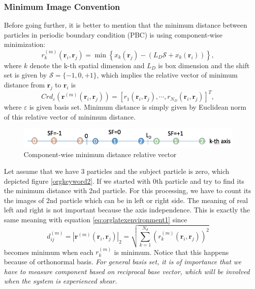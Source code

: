 \documentclass[11pt]{article}
\begin{document}
\subsubsection{Minimum Image Convention}
\label{sec:orgheadline4}
Before going further, it is better to mention that the minimum distance between particles in periodic boundary condition (PBC) is using component-wise minimization:
\begin{equation}
\label{eq:orglatexenvironment1}
r^{(m)}_k(\mathbf{r}_i, \mathbf{r}_j) = \min\left\{x_k(\mathbf{r}_j) - \left(L_D\mathscr{S} + x_k(\mathbf{r}_i)\right)\right\},
\end{equation}
where \(k\) denote the k-th spatial dimension and \(L_D\) is box dimension and the shift set is given by \(\mathscr{S} = \{-1, 0, +1\}\),
which implies the relative vector of minimum distance from \(\mathbf{r}_j\) to \(\mathbf{r}_i\) is
\begin{equation}
Crd_{\varepsilon}\left(\mathbf{r}^{(m)}(\mathbf{r}_i, \mathbf{r}_j)\right) = [r_1(\mathbf{r}_i, \mathbf{r}_j), \cdots, r_{N_D}(\mathbf{r}_i, \mathbf{r}_j)]^T,
\end{equation}
where \(\varepsilon\) is given basis set. Minimum distance is simply given by Euclidean norm of this relative vector of minimum distance.

\begin{figure}[htb]
\centering
\includegraphics[width=.9\linewidth]{data_structure/comp_minimum_distance.png}
\caption{Component-wise minimum distance relative vector}
\end{figure}

Let assume that we have 3 particles and the subject particle is zero, which depicted figure \ref{orgkeyword2}. If we started with 0th particle and try to find its the minimum distance with 2nd particle. For this processing, we have to count its the images of 2nd particle which can be in left or right side. The meaning of real left and right is not important because the axis independence. This is exactly the same meaning with equation \ref{eq:orglatexenvironment1} since
\begin{equation}
d^{(m)}_{ij} = \left|\mathbf{r}^{(m)}(\mathbf{r}_i, \mathbf{r}_j)\right|_2 = \sqrt{\sum_{k=1}^{N_d} (r^{(m)}_k(\mathbf{r}_i, \mathbf{r}_j))^2}
\end{equation}
becomes minimum when each \(r^{(m)}_k\) is minimum. Notice that this happens because of orthonormal basis. \emph{For general basis set, it is of importance that we have to measure component based on reciprocal base vector, which will be involved when the system is experienced shear.} 
\end{document}
